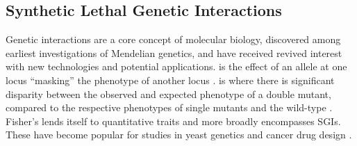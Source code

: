 


\subsection{Synthetic Lethal Genetic Interactions}
Genetic interactions are a core concept of molecular biology, discovered among earliest investigations of Mendelian genetics, and have received revived interest with new technologies and potential applications.  is the effect of an \gls{allele} at one locus ``masking'' the phenotype of another locus \citep{Bateson1909}.  is where there is significant disparity between the observed and expected phenotype of a double \gls{mutant}, compared to the respective phenotypes of single \glspl{mutant} and the \gls{wild-type} \citep{Fisher1919}. Fisher's  lends itself to quantitative traits and more broadly encompasses \glspl{SGI}. These have become popular for studies in yeast genetics and cancer drug design \citep{Boone2007, Kaelin2005}.

